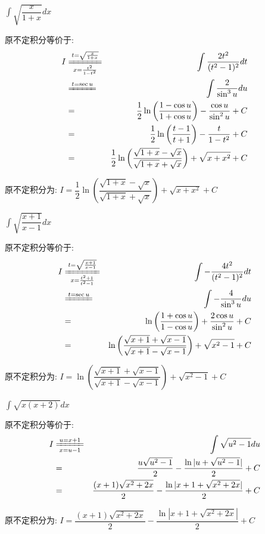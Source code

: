 \begin{proposition}
	$\int \sqrt{\dfrac{x}{1+x}}dx$
\end{proposition}
\begin{solution}
		
	原不定积分等价于:  
	\begin{eqnarray*}
		I&\xlongequal[x=\frac{t^2}{1-t^2}]{t=\sqrt{\frac{x}{1+x}}}&\int\dfrac{2t^2}{(t^2-1)^2}dt\\
		&\xlongequal{t=\sec u}&\int \dfrac{2}{\sin^3 u}du\\
		&=&\dfrac{1}{2}\ln\left(\dfrac{1-\cos u}{1+\cos u} \right)-\dfrac{\cos u}{\sin^2 u}+C\\
		&=&\dfrac{1}{2}\ln\left(\dfrac{t-1}{t+1} \right)-\dfrac{t}{1-t^2}+C\\
		&=&\dfrac{1}{2}\ln\left(\dfrac{\sqrt{1+x}-\sqrt{x}}{\sqrt{1+x}+\sqrt{x}} \right)+\sqrt{x+x^2}+C
	\end{eqnarray*}
	
	原不定积分为:  $I=\dfrac{1}{2}\ln\left(\dfrac{\sqrt{1+x}-\sqrt{x}}{\sqrt{1+x}+\sqrt{x}} \right)+\sqrt{x+x^2}+C$
\end{solution}

\begin{proposition}
	$\int \sqrt{\dfrac{x+1}{x-1}}dx$
\end{proposition}
\begin{solution}
		
	原不定积分等价于:  
	\begin{eqnarray*}
		I&\xlongequal[x=\frac{t^2+1}{t^2-1}]{t=\sqrt{\frac{x+1}{x-1}}}&\int-\dfrac{4t^2}{(t^2-1)^2}dt\\
		&\xlongequal{t=\sec u}&\int -\dfrac{4}{\sin^3 u}du\\
		&=&\ln\left(\dfrac{1+\cos u}{1-\cos u} \right)+\dfrac{2\cos u}{\sin^2 u}+C\\
		&=&\ln\left(\dfrac{\sqrt{x+1}+\sqrt{x-1}}{\sqrt{x+1}-\sqrt{x-1}} \right)+\sqrt{x^2-1}+C
	\end{eqnarray*}
	
	原不定积分为:  $I=\ln\left(\dfrac{\sqrt{x+1}+\sqrt{x-1}}{\sqrt{x+1}-\sqrt{x-1}} \right)+\sqrt{x^2-1}+C$
\end{solution}
\begin{proposition}
	$\int \sqrt{x(x+2)}dx$
\end{proposition}
\begin{solution}
		
	原不定积分等价于:  
	\begin{eqnarray*}
		I&\xlongequal[x=u-1]{u=x+1}&\int \sqrt{u^2-1}du\\
		&=&\dfrac{u\sqrt{u^2-1}}{2}-\dfrac{\ln |u+\sqrt{u^2-1}|}{2}+C\\
		&=&\dfrac{(x+1)\sqrt{x^2+2x}}{2}-\dfrac{\ln |x+1+\sqrt{x^2+2x}|}{2}+C
	\end{eqnarray*}
	
	原不定积分为:  $I=\dfrac{(x+1)\sqrt{x^2+2x}}{2}-\dfrac{\ln|x+1+\sqrt{x^2+2x}|}{2}+C$
\end{solution}

